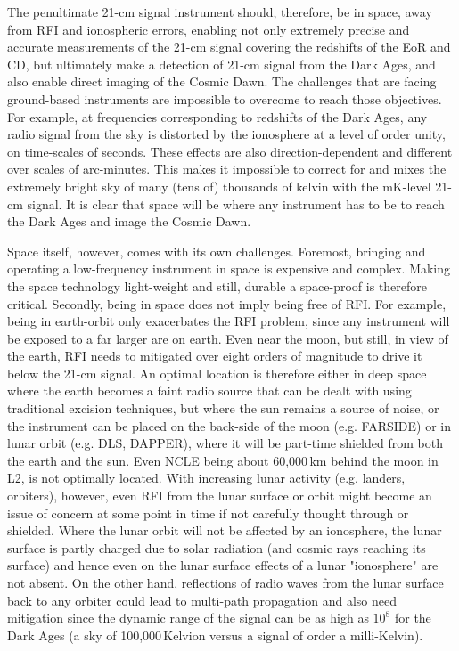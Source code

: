 The penultimate 21-cm signal instrument should, therefore, be in space, away from RFI and ionospheric errors, enabling not only extremely precise and accurate measurements of the 21-cm signal covering the redshifts of the EoR and CD, but ultimately make a detection of 21-cm signal from the Dark Ages, and also enable direct imaging of the Cosmic Dawn. The challenges that are facing ground-based instruments are impossible to overcome to reach those objectives. For example, at frequencies corresponding to redshifts of the Dark Ages, any radio signal from the sky is distorted by the ionosphere at a level of order unity, on time-scales of seconds. These effects are also direction-dependent and different over scales of arc-minutes. This makes it impossible to correct for and mixes the extremely bright sky of many (tens of) thousands of kelvin with the mK-level 21-cm signal. It is clear that space will be where any instrument has to be to reach the Dark Ages and image the Cosmic Dawn.

Space itself, however, comes with its own challenges. Foremost, bringing and operating a low-frequency instrument in space is expensive and complex. Making the space technology light-weight and still, durable a space-proof is therefore critical. Secondly, being in space does not imply being free of RFI. For example, being in earth-orbit only exacerbates the RFI problem, since any instrument will be exposed to a far larger are on earth. Even near the moon, but still, in view of the earth, RFI needs to mitigated over eight orders of magnitude to drive it below the 21-cm signal. An optimal location is therefore either in deep space where the earth becomes a faint radio source that can be dealt with using traditional excision techniques, but where the sun remains a source of noise, or the instrument can be placed on the back-side of the moon (e.g. FARSIDE) or in lunar orbit (e.g. DLS, DAPPER), where it will be part-time shielded from both the earth and the sun. Even NCLE being about 60,000\,km behind the moon in L2, is not optimally located. With increasing lunar activity (e.g. landers, orbiters), however, even RFI from the lunar surface or orbit might become an issue of concern at some point in time if not carefully thought through or shielded. Where the lunar orbit will not be affected by an ionosphere, the lunar surface is partly charged due to solar radiation (and cosmic rays reaching its surface) and hence even on the lunar surface effects of a lunar "ionosphere" are not absent. On the other hand, reflections of radio waves from the lunar surface back to any orbiter could lead to multi-path propagation and also need mitigation since the dynamic range of the signal can be as high as $10^8$ for the Dark Ages (a sky of 100,000\,Kelvion versus a signal of order a milli-Kelvin).  

